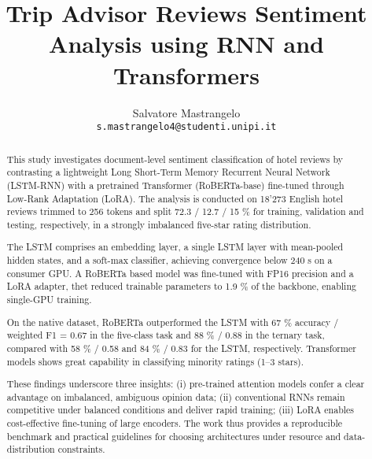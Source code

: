 \documentclass{article}
\title{Trip Advisor Reviews Sentiment Analysis using RNN and Transformers}
\author{%
  Salvatore Mastrangelo\\
  \texttt{s.mastrangelo4@studenti.unipi.it}
}
\begin{document}
\maketitle


\begin{abstract}
This study investigates document-level sentiment classification of hotel reviews 
by contrasting a lightweight Long Short-Term Memory Recurrent Neural Network (LSTM-RNN) 
with a pretrained Transformer (RoBERTa-base) fine-tuned through Low-Rank Adaptation (LoRA). 
The analysis is conducted on 18'273 English hotel reviews trimmed to 256 tokens and 
split 72.3 / 12.7 / 15 \% for training, validation and testing, respectively, in a strongly 
imbalanced five-star rating distribution.

The LSTM comprises an embedding layer, a single LSTM layer with mean-pooled hidden states, 
and a soft-max classifier, achieving convergence below 240 s on a consumer GPU. 
A RoBERTa based model was fine-tuned with FP16 precision and a LoRA adapter, thet reduced 
trainable parameters to 1.9 \% of the backbone, enabling single-GPU training.

On the native dataset, RoBERTa outperformed the LSTM with 67 \% accuracy / weighted 
F1 = 0.67 in the five-class task and 88 \% / 0.88 in the ternary task, compared with 58 \% / 0.58 and 84 \% / 0.83 for the LSTM, respectively. 
Transformer models shows great capability in classifying minority ratings (1–3 stars). 

These findings underscore three insights: (i) pre-trained attention models confer 
a clear advantage on imbalanced, ambiguous opinion data; (ii) conventional RNNs remain 
competitive under balanced conditions and deliver rapid training; (iii) LoRA enables 
cost-effective fine-tuning of large encoders. The work thus provides a reproducible 
benchmark and practical guidelines for choosing architectures under resource and 
data-distribution constraints.

\end{abstract}










\small

\end{document}

